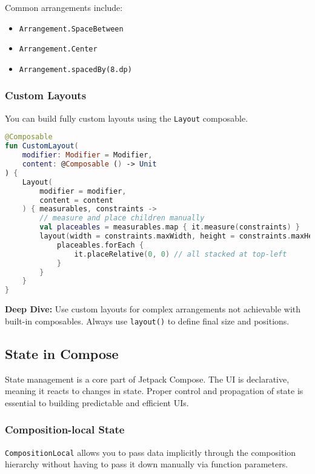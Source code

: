 \documentclass[a4paper,12pt]{article}
\begin{document}
Common arrangements include:

\begin{itemize}
    \item \texttt{Arrangement.SpaceBetween}
    \item \texttt{Arrangement.Center}
    \item \texttt{Arrangement.spacedBy(8.dp)}
\end{itemize}

\subsubsection{Custom Layouts}

You can build fully custom layouts using the \texttt{Layout} composable.

\begin{lstlisting}[language=Kotlin]
@Composable
fun CustomLayout(
    modifier: Modifier = Modifier,
    content: @Composable () -> Unit
) {
    Layout(
        modifier = modifier,
        content = content
    ) { measurables, constraints ->
        // measure and place children manually
        val placeables = measurables.map { it.measure(constraints) }
        layout(width = constraints.maxWidth, height = constraints.maxHeight) {
            placeables.forEach {
                it.placeRelative(0, 0) // all stacked at top-left
            }
        }
    }
}
\end{lstlisting}

\textbf{Deep Dive:} Use custom layouts for complex arrangements not achievable with built-in composables. Always use \texttt{layout()} to define final size and positions.

\subsection{State in Compose}

State management is a core part of Jetpack Compose. The UI is declarative, meaning it reacts to changes in state. Proper control and propagation of state is essential to building predictable and efficient UIs.

\subsubsection{Composition-local State}

\texttt{CompositionLocal} allows you to pass data implicitly through the composition hierarchy without having to pass it down manually via function parameters.
\end{document}
